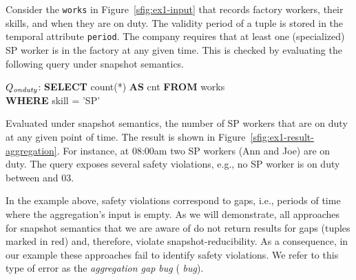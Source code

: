 \begin{exam}\label{ex:running-example-snapshot}
  Consider the \SQLrel{} \texttt{works} in Figure~\ref{sfig:ex1-input} that
  records factory workers, their skills, and when they are on duty.
  The validity period of a tuple is stored in the temporal attribute
  \texttt{period}.
  The company %
  requires that at least one (specialized) SP worker is in the
  factory at any given time. This is checked by evaluating the following
   query under snapshot semantics.
  \begin{tt}
    \begin{tabbing}
      $Q_\mathit{onduty}$:
      \=\textbf{SELECT} count(*) \textbf{AS} cnt \textbf{FROM} works\\
      \>\textbf{WHERE} skill = 'SP'
    \end{tabbing}
  \end{tt}
  Evaluated under snapshot semantics,  the number of SP workers that are
  on duty at any given point of time. The result is shown in
  Figure~\ref{sfig:ex1-result-aggregation}. For instance, at 08:00am two
  SP workers (Ann and Joe) are on duty. The query exposes several
  safety violations, e.g., no SP worker is on duty between  %
  and
  03. %
\end{exam}

In the example above, safety violations correspond to gaps, i.e.,
periods of time where the aggregation's input is empty. As we will
demonstrate, all approaches for snapshot semantics that we are aware
of do not return %
results for gaps (tuples marked in red)
and, therefore, violate snapshot-reducibility.
%
%
 As a consequence, in
our example these approaches fail to identify safety violations.  We refer to this
type of error as the \emph{aggregation gap bug} (\emph{\abbrAGB{}
  bug}).


